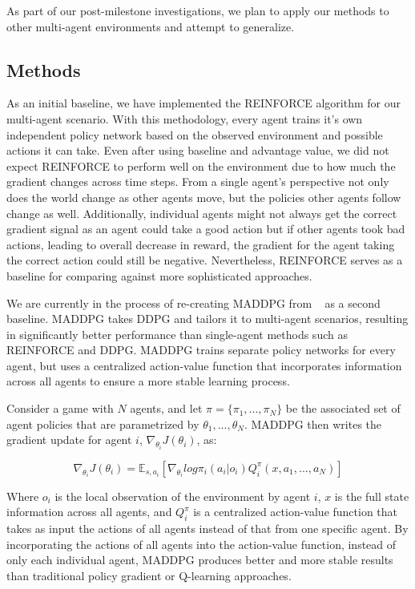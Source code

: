 \documentclass{article}
\begin{document}
As part of our post-milestone investigations, we plan to apply our methods to other multi-agent environments and attempt to generalize.

\subsection{Methods}
As an initial baseline, we have implemented the REINFORCE algorithm for our multi-agent scenario. With this methodology, every agent trains it's own independent policy network based on the observed environment and possible actions it can take. Even after using baseline and advantage value, we did not expect REINFORCE to perform well on the environment due to how much the gradient changes across time steps. From a single agent's perspective not only does the world change as other agents move, but the policies other agents follow change as well. Additionally, individual agents might not always get the correct gradient signal as an agent could take a good action but if other agents took bad actions, leading to overall decrease in reward, the gradient for the agent taking the correct action could still be negative. Nevertheless, REINFORCE serves as a baseline for comparing against more sophisticated approaches.

We are currently in the process of re-creating MADDPG from ~\cite{maddpg} as a second baseline. MADDPG takes DDPG and tailors it to multi-agent scenarios, resulting in significantly better performance than single-agent methods such as REINFORCE and DDPG. MADDPG trains separate policy networks for every agent, but uses a centralized action-value function that incorporates information across all agents to ensure a more stable learning process. 

Consider a game with $N$ agents, and let $\pi = \{\pi_1, ..., \pi_N\}$ be the associated set of agent policies that are parametrized by $\theta_1, ..., \theta_N$. MADDPG then writes the gradient update for agent $i$, $\nabla_{\theta_i} J(\theta_i)$, as:

$$\nabla_{\theta_i}J(\theta_i) = \mathbb{E}_{s, a_i}[\nabla_{\theta_i}log \pi_i(a_i|o_i)Q^{\pi}_i(x, a_1, ..., a_N)]$$

Where $o_i$ is the local observation of the environment by agent $i$, $x$ is the full state information across all agents, and $Q^{\pi}_i$ is a centralized action-value function that takes as input the actions of all agents instead of that from one specific agent. By incorporating the actions of all agents into the action-value function, instead of only each individual agent, MADDPG produces better and more stable results than traditional policy gradient or Q-learning approaches.
\end{document}

